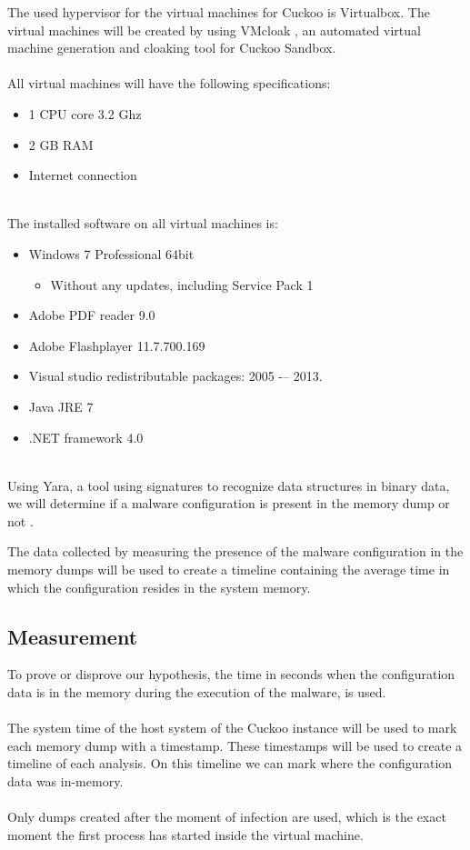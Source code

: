 \documentclass[conference]{IEEEtran}
\begin{document}
The used hypervisor for the virtual machines for Cuckoo is Virtualbox. The virtual machines will be created by using VMcloak \cite{vmcloak}, an automated virtual machine generation and cloaking tool for Cuckoo Sandbox.\\\\
All virtual machines will have the following specifications:
\begin{itemize}
\item 1 CPU core 3.2 Ghz
\item 2 GB RAM
\item Internet connection
\end{itemize}
\ \\
The installed software on all virtual machines is:
\begin{itemize}
\item Windows 7 Professional 64bit
\begin{itemize}
\item Without any updates, including Service Pack 1
\end{itemize}
\item Adobe PDF reader 9.0
\item Adobe Flashplayer 11.7.700.169
\item Visual studio redistributable packages: 2005 -– 2013.
\item Java JRE 7
\item .NET framework 4.0
\end{itemize}

\ \\Using Yara, a tool using signatures to recognize data structures in binary  data, we will determine if a malware configuration is present in the memory dump or not \cite{roberston-ioc}.

The data collected by measuring the presence of the malware configuration in the memory dumps will be used to create a timeline containing the average time in which the configuration resides in the system memory.


\subsection{Measurement}
To prove or disprove our hypothesis, the time in seconds when the configuration data is in the memory during the execution of the malware, is used. \\\\The system time of the host system of the Cuckoo instance will be used to mark each memory dump with a timestamp. These timestamps will be used to create a timeline of each analysis. On this timeline we can mark where the configuration data was in-memory.\\\\Only dumps created after the moment of infection are used, which is the exact moment the first process has started inside the virtual machine.
\end{document}
